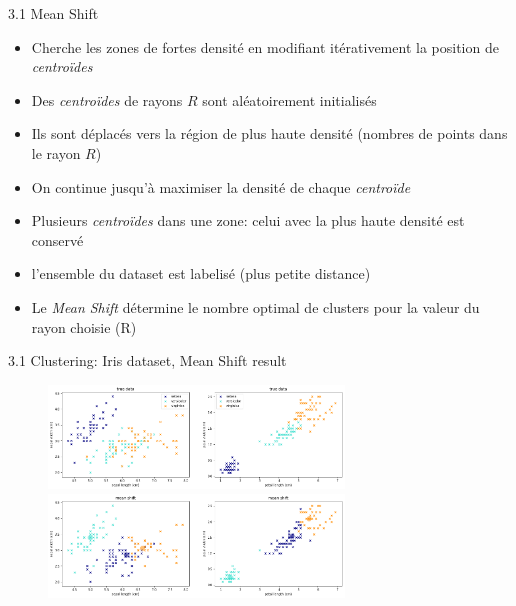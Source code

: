 \begin{frame}{3.1 Mean Shift}
  \begin{itemize}
  \item Cherche les zones de fortes densité en modifiant itérativement la position de \textit{centroïdes}
  \item Des \textit{centroïdes} de rayons $R$ sont aléatoirement initialisés
  \item Ils sont déplacés vers la région de plus haute densité (nombres de points dans le rayon $R$)
  \item On continue jusqu'à maximiser la densité de chaque \textit{centroïde}
  \item Plusieurs \textit{centroïdes} dans une zone: celui avec la plus haute densité est conservé
  \item l'ensemble du dataset est labelisé (plus petite distance)
  \item Le \textit{Mean Shift} détermine le nombre optimal de clusters pour la valeur du rayon choisie (R)
  \end{itemize}
\end{frame}

\begin{frame}{3.1 Clustering: Iris dataset, Mean Shift result}
  \begin{figure}
    \includegraphics[width=0.7\textwidth]{figs/clusteringTrue.png}
    \includegraphics[width=0.7\textwidth]{figs/clusteringMeanShift.png}
  \end{figure}
\end{frame}

